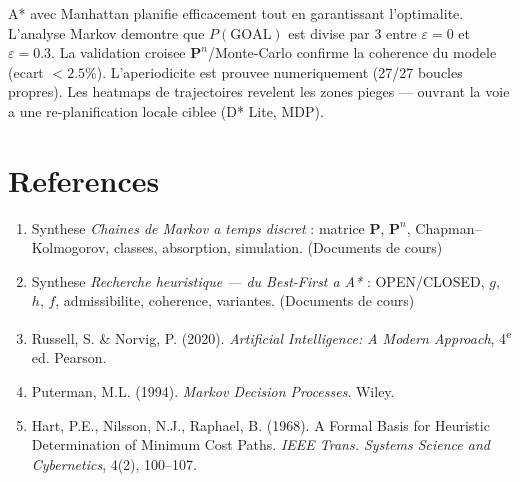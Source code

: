 \documentclass[11pt,a4paper]{article}
\begin{document}
A* avec Manhattan planifie efficacement tout en garantissant l'optimalite. L'analyse Markov
demontre que $P(\text{GOAL})$ est divise par 3 entre $\varepsilon=0$ et $\varepsilon=0.3$.
La validation croisee $\mathbf{P}^n$/Monte-Carlo confirme la coherence du modele (ecart $<2.5\%$).
L'aperiodicite est prouvee numeriquement (27/27 boucles propres). Les heatmaps de trajectoires
revelent les zones pieges --- ouvrant la voie a une re-planification locale ciblee (D* Lite, MDP).

\section*{References}
\begin{enumerate}[leftmargin=1.4cm,itemsep=2pt]
  \item Synthese \textit{Chaines de Markov a temps discret} : matrice $\mathbf{P}$, $\mathbf{P}^n$, Chapman--Kolmogorov, classes, absorption, simulation. (Documents de cours)
  \item Synthese \textit{Recherche heuristique --- du Best-First a A*} : OPEN/CLOSED, $g$, $h$, $f$, admissibilite, coherence, variantes. (Documents de cours)
  \item Russell, S. \& Norvig, P. (2020). \textit{Artificial Intelligence: A Modern Approach}, 4\textsuperscript{e} ed. Pearson.
  \item Puterman, M.L. (1994). \textit{Markov Decision Processes}. Wiley.
  \item Hart, P.E., Nilsson, N.J., Raphael, B. (1968). A Formal Basis for Heuristic Determination of Minimum Cost Paths. \textit{IEEE Trans. Systems Science and Cybernetics}, 4(2), 100--107.
\end{enumerate}
\end{document}

